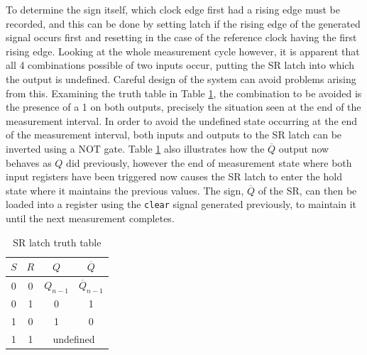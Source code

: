 To determine the sign itself, which clock edge first had a rising edge must be recorded, and this can be done by setting  latch if the rising edge of the generated signal occurs first and resetting in the case of the reference clock having the first rising edge. Looking at the whole measurement cycle however, it is apparent that all 4 combinations possible of two inputs occur, putting the \ac{SR} latch into which the output is undefined. Careful design of the system can avoid problems arising from this. Examining the truth table in Table \ref{table:sr_tt}, the combination to be avoided is the presence of a 1 on both outputs, precisely the situation seen at the end of the measurement interval. In order to avoid the undefined state occurring at the end of the measurement interval, both inputs and outputs to the \ac{SR} latch can be inverted using a NOT gate. Table \ref{table:sr_tt} also illustrates how the $\overline{Q}$ output now behaves as $Q$ did previously, however the end of measurement state where both input registers have been triggered now causes the \ac{SR} latch to enter the hold state where it maintains the previous values. The sign, $\overline{Q}$ of the \ac{SR}, can then be loaded into a register using the \texttt{clear} signal generated previously, to maintain it until the next measurement completes.
\begin{table}[ht]
	\begin{center}
		\begin{tabular}{cc|cc}           
			$S$&$R$&$Q$&$\overline{Q}$\\
			\hline
			0&0&$Q_{n-1}$&$\overline{Q}_{n-1}$\T\\
			0&1&0&1\T\\
			1&0&1&0\T\\
			1&1&\multicolumn{2}{c}{undefined}\T\\					
		\end{tabular}
		\caption{SR latch truth table}
		\label{table:sr_tt}
	\end{center}
\end{table}

